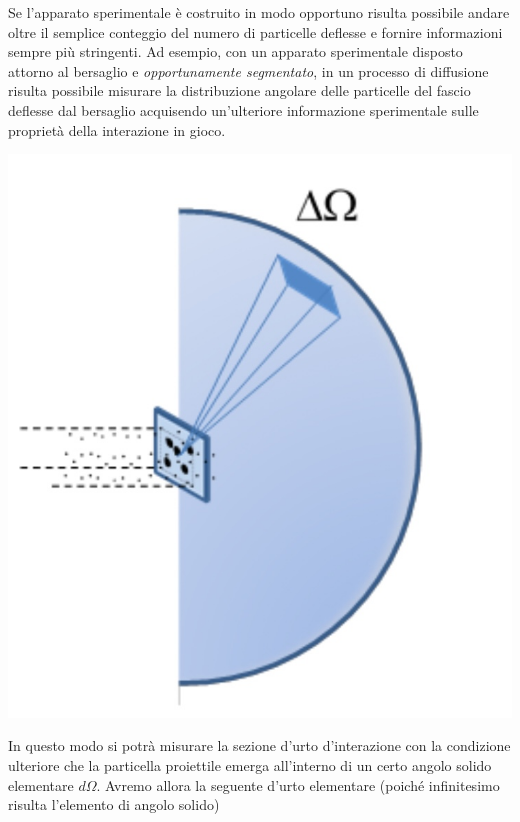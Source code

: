 Se l'apparato sperimentale è costruito in modo opportuno risulta
possibile andare oltre il semplice conteggio del numero di particelle
deflesse e fornire informazioni sempre più stringenti.
Ad esempio, con un apparato sperimentale disposto attorno al bersaglio e
\emph{opportunamente segmentato}, in un processo di diffusione risulta
possibile misurare la distribuzione angolare delle particelle del fascio
deflesse dal bersaglio acquisendo un'ulteriore informazione sperimentale
sulle proprietà della interazione in gioco.
\begin{marginfigure}
	\includegraphics{figs/solid-angle-cross-section}
	\label{fig:solid-angle-cross-section}
\end{marginfigure}
In questo modo si potrà misurare la sezione d'urto d'interazione con la condizione ulteriore che
la particella proiettile emerga all'interno di un certo angolo solido
elementare \(d \Omega\).
Avremo allora la seguente d'urto elementare
(poiché infinitesimo risulta l'elemento di angolo solido)

